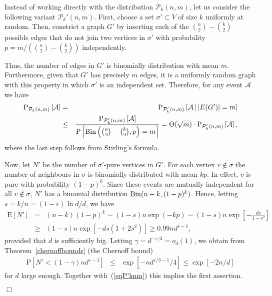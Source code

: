 \documentclass[a4paper,10pt]{article}
\makeatletter
\newenvironment{proof}{\noindent{\bf Proof\@:}}{\hfill $\Box$\\}
\newcommand\cA{\mathcal{A}}
\newcommand\cP{\mathcal{P}}
\newcommand\eps{\varepsilon}
\newcommand\Erw{\mathrm{E}}
\newcommand\pr{\mathrm{P}}
\newcommand{\Bin}{{\rm Bin}}
\newcommand{\bink}[2] {{{#1}\choose {#2}}}
\newcommand\bc[1]{\left({#1}\right)}
\newcommand\brk[1]{\left\lbrack{#1}\right\rbrack}
\newcommand\Thm{Theorem}
\makeatother
\begin{document}
\begin{proof}
Instead of working directly with the distribution $\cP_k(n,m)$,
let us consider the following variant $\cP_k'(n,m)$. First,
choose a set $\sigma'\subset V$ of size $k$ uniformly at random.
Then, constrict a graph $G'$ by inserting each of the $\bink n2-\bink k2$ possible
edges that do not join two vertices in $\sigma'$ with probability
$p=m/(\bink n2-\bink k2)$ independently.

Thus, the number of edges in $G'$ is binomially distribution with
mean $m$. Furthermore, given that $G'$ has precisely $m$ edges, it
is a uniformly random graph with this property in which $\sigma'$
is an independent set. Therefore, for any event $\cA$ we have
	\begin{eqnarray}\nonumber
	\pr_{\cP_k(n,m)}\brk{\cA}&=&
		\pr_{\cP_k'(n,m)}\brk{\cA\,|\,|E(G')|=m}\\
		&\leq&\frac{\pr_{\cP_k'(n,m)}\brk{\cA}}{\pr\brk{\Bin\bc{\bink n2-\bink k2,p}=m}}=\Theta(\sqrt m)\cdot\pr_{\cP_k'(n,m)}\brk{\cA},
			\label{eqP'knm}
	\end{eqnarray}
where the last step follows from Stirling's formula.

Now, let $N'$ be the number of $\sigma'$-pure vertices in $G'$.
For each vertex $v\not\in\sigma$ the number of neighbours in $\sigma$
is binomially distributed with mean $kp$. In effect, $v$ is pure with
probability $(1-p)^k$. Since these events are mutually independent for
all $v\not\in\sigma$, $N'$ has a binomial distribution $\Bin(n-k,(1-p)^k)$.
Hence, letting $s=k/n=(1-\eps)\ln d/d$, we have
	\begin{eqnarray*}
	\Erw\brk{N'}&=&(n-k)(1-p)^k\sim(1-s)n\exp(-kp)\sim(1-s)n\exp\brk{-\frac{ds}{1-s^2}}\\
		&\geq&(1-s)n\exp\brk{-ds\bc{1+2s^2}}\geq0.99n d^{\eps-1},
	\end{eqnarray*}
provided that $d$ is sufficiently big.
Letting $\gamma=d^{-\eps/3}=o_d(1)$, we obtain from \Thm~\ref{chernoffbounds} (the Chernoff bound)
	\begin{eqnarray*}
	\pr\brk{N'<(1-\gamma) nd^{\eps-1}}&\leq&\exp\brk{-nd^{\eps/3-1}/4}\leq\exp\brk{-2n/d}
	\end{eqnarray*}
for $d$ large enough.
Together with~(\ref{eqP'knm}) this implies the first assertion.


\end{proof}
\end{document}
